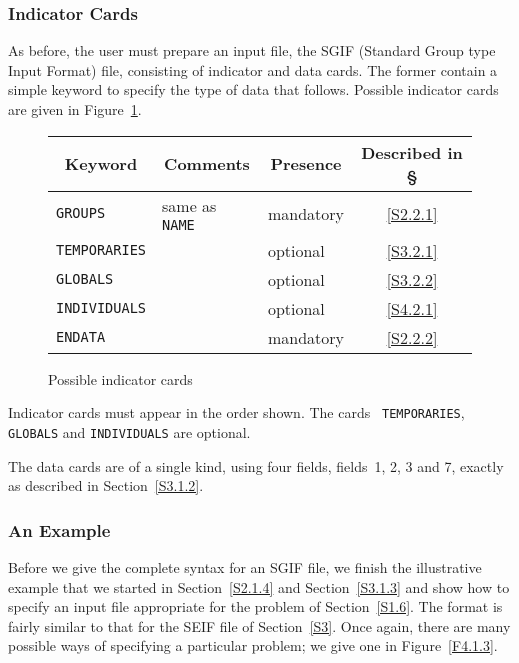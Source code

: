 \documentclass[a4paper]{article}
\newcommand{\bcftable}[1]{\begin{figure}[htbp]
                          \begin{center}
                          \begin{tabular}{#1} }
\newcommand{\ecftable}[1]{\end{tabular}
                          \caption{#1}
                          \end{center}
                          \end{figure} }
\begin{document}
\subsubsection{\label{S4.1.2}Indicator Cards}

As  before, the  user must prepare  an  input file, the SGIF (Standard
Group type Input Format)
file, consisting of indicator  and data cards.
The former  contain a simple keyword
to  specify the type of data that
follows.  Possible indicator cards are given in Figure~\ref{F4.1}.

{\small
\bcftable{lllc}
\multicolumn{1}{c}{Keyword} &
\multicolumn{1}{c}{Comments} &
\multicolumn{1}{c}{Presence} &
Described in \S \\
\hline
{\tt GROUPS}      &  same as {\tt NAME} & mandatory & \ref{S2.2.1} \\
{\tt TEMPORARIES} &                     & optional  & \ref{S3.2.1} \\
{\tt GLOBALS}     &                     & optional  & \ref{S3.2.2} \\
{\tt INDIVIDUALS} &                     & optional  & \ref{S4.2.1} \\
{\tt ENDATA}      &                     & mandatory & \ref{S2.2.2} \\
\hline
\ecftable{\label{F4.1}Possible indicator cards}
}

Indicator   cards
must  appear in  the  order shown.  The  cards  {\tt
TEMPORARIES}, {\tt GLOBALS} and {\tt INDIVIDUALS}
are optional.

The data cards
are of a single kind, using four fields, fields~1, 2, 3
and 7, exactly as described in Section~\ref{S3.1.2}.

\subsubsection{\label{S4.1.3} An Example}

Before we give  the complete syntax for  an  SGIF  file, we finish the
illustrative    example that we   started in  Section~\ref{S2.1.4} and
Section~\ref{S3.1.3} and show how to specify an input file appropriate
for the  problem of Section~\ref{S1.6}.  The  format is fairly similar
to that for the SEIF file of Section~\ref{S3}.  Once again,  there are
many possible ways of specifying a particular problem;  we give one in
Figure~\ref{F4.1.3}.
\end{document}
